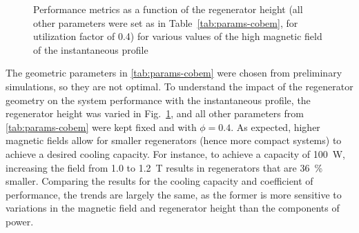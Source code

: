 \documentclass[referee]{svjour3}
\begin{document}
\begin{figure}[!ht]
  \centering
\quad
  \caption{Performance metrics as a function of the regenerator height (all other parameters were set as in Table~\ref{tab:params-cobem}, for utilization factor of 0.4) for various values of the high magnetic field of the instantaneous profile}
\label{fig:Qc_H_inst}
\end{figure}


The geometric parameters in \autoref{tab:params-cobem} were chosen from preliminary simulations, so they are not  optimal. To understand the impact of the regenerator geometry on the system performance with the instantaneous profile, the regenerator height was varied in Fig.~\ref{fig:Qc_H_inst}, and all other parameters from \autoref{tab:params-cobem} were kept fixed and with $\phi=0.4$. As expected, higher magnetic fields allow for smaller regenerators (hence more compact systems) to achieve a desired cooling capacity. For instance, to achieve a capacity of \SI{100}{\watt}, increasing the field from \num{1.0} to \SI{1.2}{\tesla} results in regenerators that are \SI{36}{\percent} smaller. Comparing the results for the cooling capacity and coefficient of performance, the trends are largely the same, as the former is more sensitive to variations in the magnetic field and regenerator height than the components of power.
\end{document}
